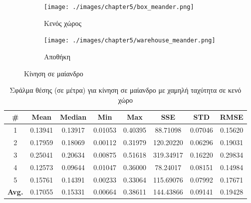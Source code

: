 \begin{figure}[!ht]
        \begin{subfigure}{0.5\textwidth}
            \texttt{[image: ./images/chapter5/box\_meander.png]}
                \caption{Κενός χώρος}
             \label{fig:box_meander}
        \end{subfigure}
        \begin{subfigure}{0.5\textwidth}
            \texttt{[image: ./images/chapter5/warehouse\_meander.png]}
            \caption{Αποθήκη}
            \label{fig:warehouse_meander}
        \end{subfigure}
        \caption{Κίνηση σε μαίανδρο}
        \label{fig:meander}
\end{figure}


\begin{table}[H]
    \centering
    \caption{Σφάλμα θέσης (σε μέτρα) για κίνηση σε μαίανδρο με χαμηλή ταχύτητα σε κενό χώρο}
    \label{tab:position_error_meander_slow_box}
    \begin{tabular}{| c | c | c | c | c | c | c | c | }
        \hline
        \rowcolor{Gray}
        \# & Mean & Median & Min & Max & SSE & STD & RMSE \\
        \hline
        1 & 0.13941 & 0.13917 & 0.01053 & 0.40395 & 88.71098 & 0.07046 & 0.15620 \\
        2 & 0.17959 & 0.18069 & 0.00112 & 0.31979 & 120.20220 & 0.06296 & 0.19031 \\
        3 & 0.25041 & 0.20634 & 0.00875 & 0.51618 & 319.34917 & 0.16220 & 0.29834 \\
        4 & 0.12573 & 0.09644 & 0.01047 & 0.36000 & 78.24017 & 0.08151 & 0.14984 \\
        5 & 0.15761 & 0.14391 & 0.00233 & 0.33064 & 115.69076 & 0.07992 & 0.17671 \\
        \hline
        \textbf{Avg.} & 0.17055 & 0.15331 & 0.00664 & 0.38611 & 144.43866 & 0.09141 & 0.19428 \\
        \hline
    \end{tabular}
\end{table}

